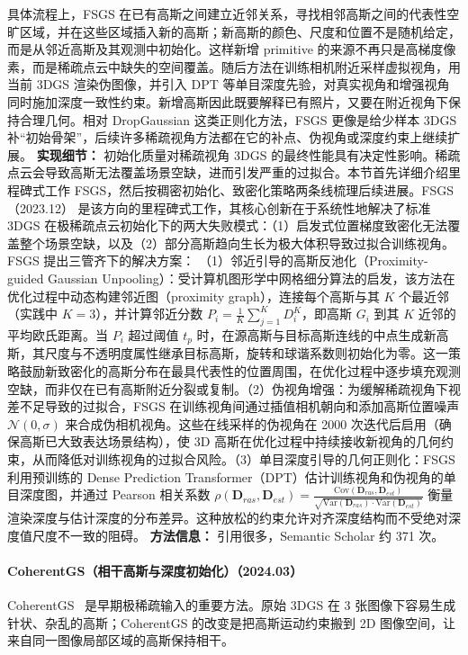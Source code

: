 具体流程上，FSGS 在已有高斯之间建立近邻关系，寻找相邻高斯之间的代表性空旷区域，并在这些区域插入新的高斯；新高斯的颜色、尺度和位置不是随机给定，而是从邻近高斯及其观测中初始化。这样新增 primitive 的来源不再只是高梯度像素，而是稀疏点云中缺失的空间覆盖。随后方法在训练相机附近采样虚拟视角，用当前 3DGS 渲染伪图像，并引入 DPT 等单目深度先验，对真实视角和增强视角同时施加深度一致性约束。新增高斯因此既要解释已有照片，又要在附近视角下保持合理几何。相对 DropGaussian 这类正则化方法，FSGS 更像是给少样本 3DGS 补“初始骨架”，后续许多稀疏视角方法都在它的补点、伪视角或深度约束上继续扩展。
\textbf{实现细节：} 初始化质量对稀疏视角 3DGS 的最终性能具有决定性影响。稀疏点云会导致高斯无法覆盖场景空缺，进而引发严重的过拟合。本节首先详细介绍里程碑式工作 FSGS，然后按稠密初始化、致密化策略两条线梳理后续进展。FSGS（2023.12） 是该方向的里程碑式工作，其核心创新在于系统性地解决了标准 3DGS 在极稀疏点云初始化下的两大失败模式：（1）启发式位置梯度致密化无法覆盖整个场景空缺，以及（2）部分高斯趋向生长为极大体积导致过拟合训练视角。FSGS 提出三管齐下的解决方案： （1）邻近引导的高斯反池化（Proximity-guided Gaussian Unpooling）：受计算机图形学中网格细分算法的启发，该方法在优化过程中动态构建邻近图（proximity graph），连接每个高斯与其 $K$ 个最近邻（实践中 $K{=}3$），并计算邻近分数 $P_i = \frac{1}{K}\sum_{j=1}^{K} D_i^K$，即高斯 $G_i$ 到其 $K$ 近邻的平均欧氏距离。当 $P_i$ 超过阈值 $t_p$ 时，在源高斯与目标高斯连线的中点生成新高斯，其尺度与不透明度属性继承目标高斯，旋转和球谐系数则初始化为零。这一策略鼓励新致密化的高斯分布在最具代表性的位置周围，在优化过程中逐步填充观测空缺，而非仅在已有高斯附近分裂或复制。（2）伪视角增强：为缓解稀疏视角下视差不足导致的过拟合，FSGS 在训练视角间通过插值相机朝向和添加高斯位置噪声 $\mathcal{N}(0, \sigma)$ 来合成伪相机视角。这些在线采样的伪视角在 2000 次迭代后启用（确保高斯已大致表达场景结构），使 3D 高斯在优化过程中持续接收新视角的几何约束，从而降低对训练视角的过拟合风险。（3）单目深度引导的几何正则化：FSGS 利用预训练的 Dense Prediction Transformer（DPT）估计训练视角和伪视角的单目深度图，并通过 Pearson 相关系数 $\rho(\mathbf{D}_{ras}, \mathbf{D}_{est}) = \frac{\mathrm{Cov}(\mathbf{D}_{ras}, \mathbf{D}_{est})}{\sqrt{\mathrm{Var}(\mathbf{D}_{ras}) \cdot \mathrm{Var}(\mathbf{D}_{est})}}$ 衡量渲染深度与估计深度的分布差异。这种放松的约束允许对齐深度结构而不受绝对深度值尺度不一致的阻碍。
\textbf{方法信息：} 引用很多，Semantic Scholar 约 371 次。



\paragraph{CoherentGS（相干高斯与深度初始化）（2024.03）}
CoherentGS~\cite{2403_19495} 是早期极稀疏输入的重要方法。原始 3DGS 在 3 张图像下容易生成针状、杂乱的高斯；CoherentGS 的改变是把高斯运动约束搬到 2D 图像空间，让来自同一图像局部区域的高斯保持相干。


